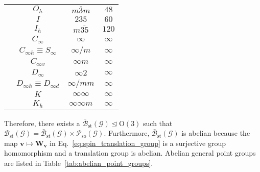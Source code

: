 \begin{table}[tb]
\begin{tabular}{cccc}
    & $O_{h}$ & $m\overline{3}m$ & $48$ \\
    & $I$     & $235$            & $60$ \\
    & $I_{h}$ & $m\overline{35}$ & $120$ \\
    \hline
    & $C_{\infty}$                       & $\infty$          & $\infty$ \\
    & $C_{\infty h} \equiv S_{\infty}$   & $\infty / m$      & $\infty$ \\
    & $C_{\infty v}$                     & $\infty m$        & $\infty$ \\
    & $D_{\infty}$                       & $\infty 2$        & $\infty$ \\
    & $D_{\infty h} \equiv D_{\infty d}$ & $\infty / mm$     & $\infty$\\
    & $K$                                & $\infty \infty$   & $\infty$\\
    & $K_{h}$                            & $\infty \infty m$ & $\infty$\\
    \hline \hline
  \end{tabular}
\end{table}

Therefore, there exists a  $\bar{\mathcal{B}}_{\mathrm{st}}(\mathcal{G}) \trianglelefteq \mathrm{O}(3)$ such that $\mathcal{B}_{\mathrm{st}}(\mathcal{G}) = \bar{\mathcal{B}}_{\mathrm{st}}(\mathcal{G}) \times \mathcal{P}_{\mathrm{so}}(\mathcal{G})$.
Furthermore, $\bar{\mathcal{B}}_{\mathrm{st}}(\mathcal{G})$ is abelian because the map $\bm{v} \mapsto \bm{W}_{\bm{v}}$ in Eq.~\eqref{eq:spin_translation_group} is a surjective group homomorphism and a translation group is abelian.
Abelian general point groups are listed in Table~\ref{tab:abelian_point_groups}.

